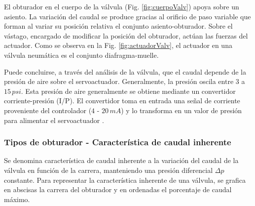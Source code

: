El obturador en el cuerpo de la válvula (Fig. \ref{fig:cuerpoValv}) apoya
sobre un asiento.
La variación del caudal se produce gracias al orificio de paso variable
que forman al variar su posición relativa el conjunto asiento-obturador.
Sobre el vástago, encargado de modificar la posición del obturador,
actúan las fuerzas del actuador.
Como se observa en la Fig. \ref{fig:actuadorValv}, el actuador en una válvula
neumática es el conjunto diafragma-muelle.

Puede concluirse, a través del análisis de la válvula, que el caudal depende de
la presión de aire sobre el servoactuador.
Generalmente, la presión oscila entre $3$ a $15\,psi$.
Esta presión de aire generalmente se obtiene mediante un convertidor
corriente-presión (I/P).
El convertidor toma en entrada una señal de corriente proveniente del
controlador
($4$ - $20\,mA$) y lo transforma en un valor de presión para alimentar el
servoactuador \cite{bib:ApuntesPuglesiValvulas}.


\subsubsection{Tipos de obturador - Característica de caudal inherente}
Se denomina característica de caudal inherente a la variación del caudal de
la válvula en función de la carrera, manteniendo una presión diferencial
$\Delta p$ constante.
Para representar la característica inherente de una válvula, se grafica en
abscisas la carrera del obturador y en ordenadas el porcentaje de caudal máximo.

